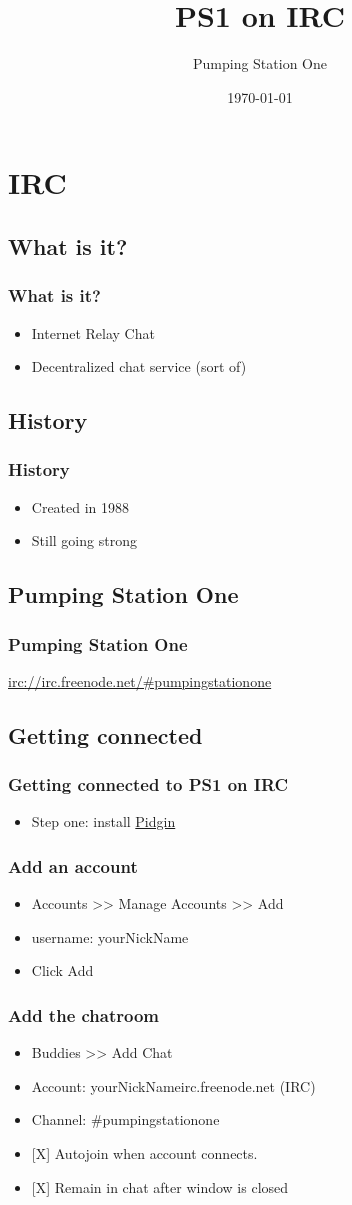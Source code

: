 \documentclass[hyperref={pdfpagelabels=false}]{beamer}
\title{PS1 on IRC}
\author{Pumping Station One}
\date{\today}
\begin{document}
\frame{\titlepage}
\section[Outline]{}
\frame{\tableofcontents}
\section{IRC}
	\subsection{What is it?}
		\frame
		{
			\frametitle{What is it?}
			\begin{itemize}
				\item{Internet Relay Chat}
				\item{Decentralized chat service (sort of)}
			\end{itemize}
		}

	\subsection{History}
		\frame
		{
			\frametitle{History}
			\begin{itemize}
				\item{Created in 1988}
				\item{Still going strong}
			\end{itemize}
		}
	\subsection{Pumping Station One}
		\frame
		{
			\frametitle{Pumping Station One}
			\url{irc://irc.freenode.net/\#pumpingstationone}
		}
	\subsection{Getting connected}
		\frame
		{
			\frametitle{Getting connected to PS1 on IRC}
			\begin{itemize}
				\item{Step one: install \href{http://pidgin.im}{Pidgin}}
			\end{itemize}
		}
		\frame
		{
			\frametitle{Add an account}
			\begin{itemize}
				\item{Accounts >> Manage Accounts >> Add}
				\item{username: yourNickName}
				\item{Click Add}
			\end{itemize}
		}
		\frame
		{
			\frametitle{Add the chatroom}
			\begin{itemize}
				\item{Buddies >> Add Chat}
				\item{Account: yourNickName\makeatletter@\makeatother irc.freenode.net (IRC)}
				\item{Channel: \#pumpingstationone}
				\item{[X] Autojoin when account connects.}
				\item{[X] Remain in chat after window is closed}
			\end{itemize}
		}
\end{document}
